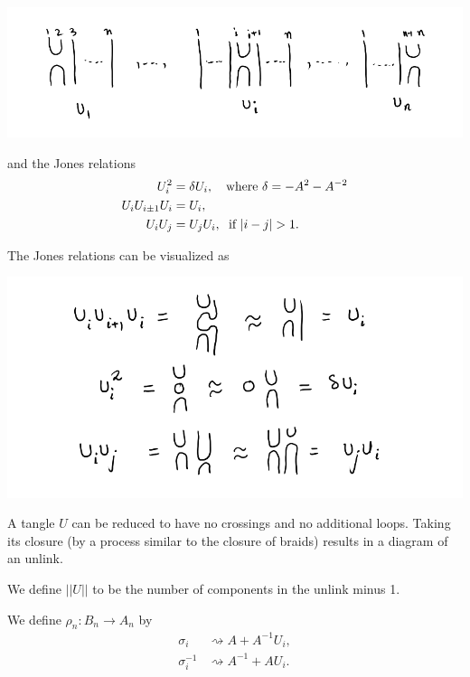 \begin{center}
  \includegraphics[scale=.25]{images/10.png}
\end{center}
  and the Jones relations 
\begin{align*}
  U_i^2 &= \delta U_i, \hspace*{1em}\text{where } \delta = -A^2-A^{-2} \\
  U_iU_{i\pm 1}U_i &= U_i, \\
  U_iU_j &= U_jU_i, \hspace*{.6em} \text{if } |i-j|>1.
\end{align*}

The Jones relations can be visualized as
\begin{center}
  \includegraphics[scale=.25]{images/11.png}
\end{center}

A tangle $U$ can be reduced to have no crossings and no additional loops. Taking its closure (by a process similar to the closure of braids) results in a diagram of an unlink.

We define $|| U ||$ to be the number of components in the unlink minus 1.

We define $\rho_n : B_n \to A_n$ by 
\begin{align*}
  \sigma_i &\rightsquigarrow A + A^{-1}U_i, \\
  \sigma^{-1}_i &\rightsquigarrow A^{-1} + AU_i.
\end{align*}

